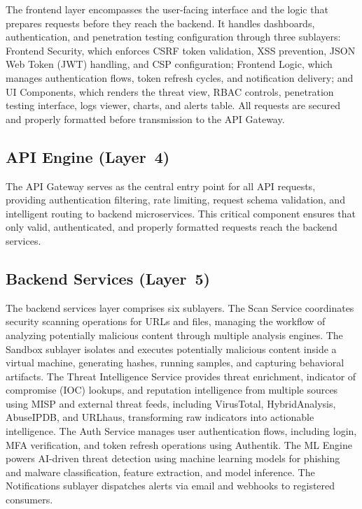 \documentclass[12pt, a4paper]{article}
\begin{document}
The frontend layer encompasses the user-facing interface and the logic that prepares requests before they reach the backend. It handles dashboards, authentication, and penetration testing configuration through three sublayers: Frontend Security, which enforces CSRF token validation, XSS prevention, JSON Web Token (JWT) handling, and CSP configuration; Frontend Logic, which manages authentication flows, token refresh cycles, and notification delivery; and UI Components, which renders the threat view, RBAC controls, penetration testing interface, logs viewer, charts, and alerts table. All requests are secured and properly formatted before transmission to the API Gateway.

\subsection{API Engine (Layer~4)}

The API Gateway serves as the central entry point for all API requests, providing authentication filtering, rate limiting, request schema validation, and intelligent routing to backend microservices. This critical component ensures that only valid, authenticated, and properly formatted requests reach the backend services.

\subsection{Backend Services (Layer~5)}

The backend services layer comprises six sublayers. The Scan Service coordinates security scanning operations for URLs and files, managing the workflow of analyzing potentially malicious content through multiple analysis engines. The Sandbox sublayer isolates and executes potentially malicious content inside a virtual machine, generating hashes, running samples, and capturing behavioral artifacts. The Threat Intelligence Service provides threat enrichment, indicator of compromise (IOC) lookups, and reputation intelligence from multiple sources using MISP and external threat feeds, including VirusTotal, HybridAnalysis, AbuseIPDB, and URLhaus, transforming raw indicators into actionable intelligence. The Auth Service manages user authentication flows, including login, MFA verification, and token refresh operations using Authentik. The ML Engine powers AI-driven threat detection using machine learning models for phishing and malware classification, feature extraction, and model inference. The Notifications sublayer dispatches alerts via email and webhooks to registered consumers.
\end{document}
